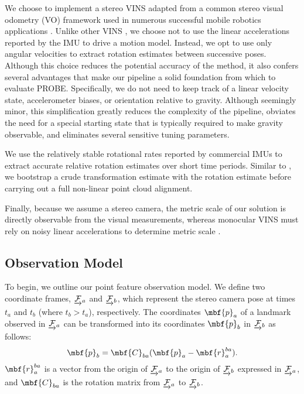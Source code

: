 \documentclass[letterpaper, 10 pt, conference]{ieeeconf}  %
\begin{document}
We choose to implement a stereo VINS adapted from a common stereo visual odometry (VO) framework used in numerous successful mobile robotics applications \cite{Cheng:2006kl, Kelly:2008tr, Geiger:2011jb}.
Unlike other VINS \cite{Leutenegger:2014hk, Anonymous:5tilMnYo}, we choose not to use the linear accelerations reported by the IMU to drive a motion model.
Instead, we opt to use only angular velocities to extract rotation estimates between successive poses. Although this choice reduces the potential accuracy of the method, it also confers several advantages that make our pipeline a solid foundation from which to evaluate PROBE. Specifically, we do not need to keep track of a linear velocity state, accelerometer biases, or orientation relative to gravity. Although seemingly minor, this simplification greatly reduces the complexity of the pipeline, obviates the need for a special starting state that is typically required to make gravity observable, and eliminates several sensitive tuning parameters.

We use the relatively stable rotational rates reported by commercial IMUs to extract accurate relative rotation estimates over short time periods.  Similar to \cite{Kneip:dw}, we bootstrap a crude transformation estimate with the rotation estimate before carrying out a full non-linear point cloud alignment.

Finally, because we assume a stereo camera, the metric scale of our solution is directly observable from the visual measurements, whereas monocular VINS must rely on noisy linear accelerations to determine metric scale \cite{Kelly:2011bw}.

\subsection{Observation Model}
To begin, we outline our point feature observation model. We define two coordinate frames, $\underrightarrow{\mathcal{F}}_{a}$ and $\underrightarrow{\mathcal{F}}_{b}$, which represent the stereo camera pose at times $t_a$ and $t_b$ (where $t_b > t_a$), respectively. The coordinates $\mbf{p}_a$ of a landmark observed in $\underrightarrow{\mathcal{F}}_{a}$ can be transformed into its coordinates $\mbf{p}_b$ in $\underrightarrow{\mathcal{F}}_{b}$ as follows:
\begin{equation}
	\mbf{p}_b =  \mbf{C}_{ba}(\mbf{p}_a - \mbf{r}_a^{ba}).
\end{equation}
$\mbf{r}_a^{ba}$ is a vector from the origin of $\underrightarrow{\mathcal{F}}_{a}$ to the origin of $\underrightarrow{\mathcal{F}}_{b}$ expressed in $\underrightarrow{\mathcal{F}}_{a}$, and $\mbf{C}_{ba}$ is the rotation matrix from $\underrightarrow{\mathcal{F}}_{a}$ to $\underrightarrow{\mathcal{F}}_{b}$.
\end{document}
